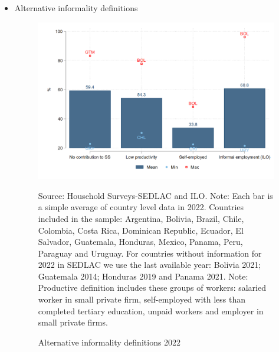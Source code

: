 \documentclass[english]{article}
\begin{document}
\begin{itemize}
    \item Alternative informality definitions
             \begin{figure}[H]
                \justifying
                \caption{Alternative informality definitions 2022}  
                \centerline{\includegraphics[scale=.3]{latex/figures/Snapshot/Alternative informality definitions_2022.png}}
                \label{fig:info_definitions}
                \footnotesize{Source: Household Surveys-SEDLAC and ILO.}
                \footnotesize{Note: Each bar is a simple average of country level data in 2022. Countries included in the sample: Argentina, Bolivia, Brazil, Chile, Colombia, Costa Rica, Dominican Republic, Ecuador, El Salvador, Guatemala, Honduras, Mexico, Panama, Peru, Paraguay and Uruguay. For countries without information for 2022 in SEDLAC we use the last available year: Bolivia 2021; Guatemala 2014; Honduras 2019 and Panama 2021. Note: Productive definition includes these groups of workers: salaried worker in small private firm, self-employed with less than completed tertiary education, unpaid workers and employer in small private firms.}
             \end{figure}


\end{itemize}
\end{document}
